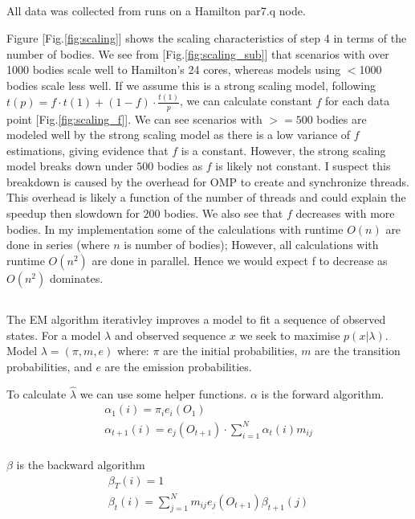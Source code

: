 \subsection{}
All data was collected from runs on a Hamilton par7.q node.

Figure [Fig.\ref{fig:scaling}] shows the scaling characteristics of step 4 in terms of the number of bodies. 
We see from [Fig.\ref{fig:scaling_sub}] that scenarios with over 1000 bodies scale well to Hamilton's 24 cores, whereas models using $<$1000 bodies scale less well. 
If we assume this is a strong scaling model, following $t(p) = f \cdot t(1) + (1-f)\cdot \frac{t(1)}{p}$, we can calculate constant $f$ for each data point [Fig.\ref{fig:scaling_f}]. We can see scenarios with $>=500$ bodies are modeled well by the strong scaling model as there is a low variance of $f$ estimations, giving evidence that $f$ is a constant. 
However, the strong scaling model breaks down under $500$ bodies as $f$ is likely not constant. 
I suspect this breakdown is caused by the overhead for OMP to create and synchronize threads. 
This overhead is likely a function of the number of threads and could explain the speedup then slowdown for $200$ bodies.
We also see that $f$ decreases with more bodies. In my implementation some of the calculations with runtime $O(n)$ are done in series (where $n$ is number of bodies); However, all calculations with runtime $O(n^2)$ are done in parallel. Hence we would expect f to decrease as $O(n^2)$ dominates.

\subsection{}
The EM algorithm iterativley improves a model to fit a sequence of observed states. For a model $\lambda$ and observed sequence $x$ we seek to maximise $p(x|\lambda)$. Model $\lambda = (\pi, m, e)$ where: $\pi$ are the initial probabilities, $m$ are the transition probabilities, and $e$ are the emission probabilities.

To calculate $\hat{\lambda}$ we can use some helper functions. $\alpha$ is the forward algorithm.
\begin{gather}
    \alpha_1(i) = \pi_i e_i(O_1)\\
    \alpha_{t+1}(i) = e_j(O_{t+1}) \cdot \sum_{i=1}^N\alpha_t(i)m_{ij} \\
\end{gather}

$\beta$ is the backward algorithm
\begin{gather}
    \beta_T(i)=1\\
    \beta_t(i)=\sum_{j=1}^N m_{ij} e_j(O_{t+1}) \beta_{t+1}(j)\\
\end{gather}

